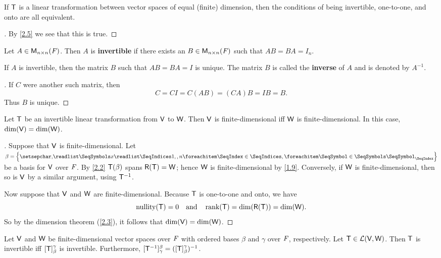 \begin{cor}\label{2.4.2}
	If \(\mathsf{T}\) is a linear transformation between vector spaces of equal (finite) dimension, then the conditions of being invertible, one-to-one, and onto are all equivalent.
\end{cor}

\begin{proof}[]
	By \cref{2.5} we see that this is true.
\end{proof}

\begin{defn}\label{2.4.3}
	Let \(A \in \mathsf{M}_{{n} \times n}({\mathit{F}})\).
	Then \(A\) is \textbf{invertible} if there exists an \(B \in \mathsf{M}_{{n} \times n}({\mathit{F}})\) such that \(AB = BA = I_n\).
\end{defn}

\begin{cor}\label{2.4.4}
	If \(A\) is invertible, then the matrix \(B\) such that \(AB = BA = I\) is unique.
	The matrix \(B\) is called the \textbf{inverse} of \(A\) and is denoted by \(A^{-1}\).
\end{cor}

\begin{proof}[]
	If \(C\) were another such matrix, then
	\[
		C = CI = C(AB) = (CA)B = IB = B.
	\]
	Thus \(B\) is unique.
\end{proof}

\begin{lem}\label{2.4.5}
	Let \(\mathsf{T}\) be an invertible linear transformation from \(\mathsf{V}\) to \(\mathsf{W}\).
	Then \(\mathsf{V}\) is finite-dimensional iff \(\mathsf{W}\) is finite-dimensional.
	In this case, \(\dim(\mathsf{V}) = \dim(\mathsf{W})\).
\end{lem}

\begin{proof}[]
	Suppose that \(\mathsf{V}\) is finite-dimensional.
	Let \(\beta = \set{\seq{x}{1,,n}}\) be a basis for \(\mathsf{V}\) over \(\mathit{F}\).
	By \cref{2.2} \(\mathsf{T}(\beta)\) spans \(\rg{\T} = \W\);
	hence \(\mathsf{W}\) is finite-dimensional by \cref{1.9}.
	Conversely, if \(\mathsf{W}\) is finite-dimensional, then so is \(\mathsf{V}\) by a similar argument, using \(\mathsf{T}^{-1}\).

	Now suppose that \(\mathsf{V}\) and \(\mathsf{W}\) are finite-dimensional.
	Because \(\mathsf{T}\) is one-to-one and onto, we have
	\[
		\nt{\T} = 0 \quad \text{and} \quad \rk{\T} = \dim(\rg{\T}) = \dim(\W).
	\]
	So by the dimension theorem (\cref{2.3}), it follows that \(\dim(\mathsf{V}) = \dim(\mathsf{W})\).
\end{proof}

\begin{thm}\label{2.18}
	Let \(\mathsf{V}\) and \(\mathsf{W}\) be finite-dimensional vector spaces over \(\mathit{F}\) with ordered bases \(\beta\) and \(\gamma\) over \(\mathit{F}\), respectively.
	Let \(\mathsf{T} \in \mathcal{L}(\mathsf{V}, \mathsf{W})\).
	Then \(\mathsf{T}\) is invertible iff \([\mathsf{T}]_{\beta}^{\gamma}\) is invertible.
	Furthermore, \([\mathsf{T}^{-1}]_{\gamma}^{\beta} = ([\mathsf{T}]_{\beta}^{\gamma})^{-1}\).
\end{thm}

